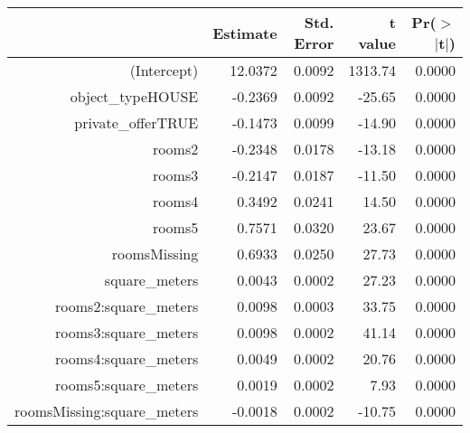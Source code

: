 \begin{table}[ht]
\centering
\begin{tabular}{rrrrr}
  \hline
 & Estimate & Std. Error & t value & Pr($>$$|$t$|$) \\ 
  \hline
(Intercept) & 12.0372 & 0.0092 & 1313.74 & 0.0000 \\ 
  object\_typeHOUSE & -0.2369 & 0.0092 & -25.65 & 0.0000 \\ 
  private\_offerTRUE & -0.1473 & 0.0099 & -14.90 & 0.0000 \\ 
  rooms2 & -0.2348 & 0.0178 & -13.18 & 0.0000 \\ 
  rooms3 & -0.2147 & 0.0187 & -11.50 & 0.0000 \\ 
  rooms4 & 0.3492 & 0.0241 & 14.50 & 0.0000 \\ 
  rooms5 & 0.7571 & 0.0320 & 23.67 & 0.0000 \\ 
  roomsMissing & 0.6933 & 0.0250 & 27.73 & 0.0000 \\ 
  square\_meters & 0.0043 & 0.0002 & 27.23 & 0.0000 \\ 
  rooms2:square\_meters & 0.0098 & 0.0003 & 33.75 & 0.0000 \\ 
  rooms3:square\_meters & 0.0098 & 0.0002 & 41.14 & 0.0000 \\ 
  rooms4:square\_meters & 0.0049 & 0.0002 & 20.76 & 0.0000 \\ 
  rooms5:square\_meters & 0.0019 & 0.0002 & 7.93 & 0.0000 \\ 
  roomsMissing:square\_meters & -0.0018 & 0.0002 & -10.75 & 0.0000 \\ 
   \hline
\end{tabular}
\end{table}
